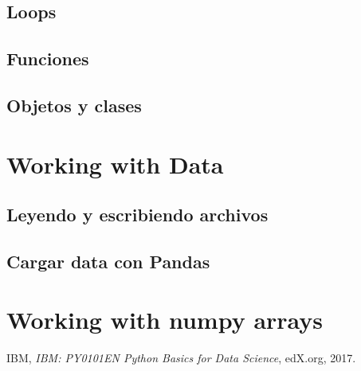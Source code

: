 \documentclass[10pt,a4paper]{article}
\begin{document}
\subsection{Loops}

\subsection{Funciones}

\subsection{Objetos y clases}

\section{Working with Data}

\subsection{Leyendo y escribiendo archivos}
\subsection{Cargar data con Pandas}

\section{Working with numpy arrays}



\begin{thebibliography}{9}

  IBM,
  \textit{ IBM: PY0101EN Python Basics for Data Science},
  edX.org,
  2017.

\end{thebibliography}
\end{document}
